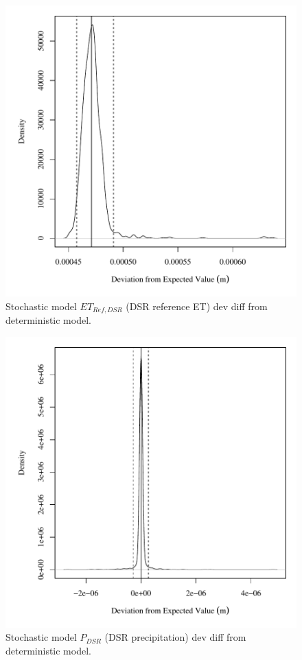 \begin{center}
\begin{figure}[htbp]
	\includegraphics[width=6in]{"Figures/Results_DSR/V dev diff et"}
	\caption{Stochastic model $ET_{Ref,DSR}$ (DSR reference ET) dev diff from deterministic model.}
\end{figure}
\end{center}
\newpage

\begin{center}
\begin{figure}[htbp]
	\includegraphics[width=6in]{"Figures/Results_DSR/V dev diff p"}
	\caption{Stochastic model $P_{DSR}$ (DSR precipitation) dev diff from deterministic model.}
\end{figure}
\end{center}
\newpage

